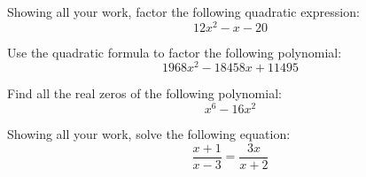 \documentclass[11pt,letterpaper]{article}
\begin{document}

 Showing all your work, factor the following quadratic expression:
	\[
	12x^2 - x - 20
	\]



\newpage



 Use the quadratic formula to factor the following polynomial:
	\[
	1968x^2 - 18458x + 11495
	\]



\newpage



 Find all the real zeros of the following polynomial:
	\[
	x^6 - 16x^2
	\]



\newpage



 Showing all your work, solve the following equation:
	\[
	\dfrac{x + 1}{x - 3}= \dfrac{3x}{x + 2}
	\]
\end{document}
